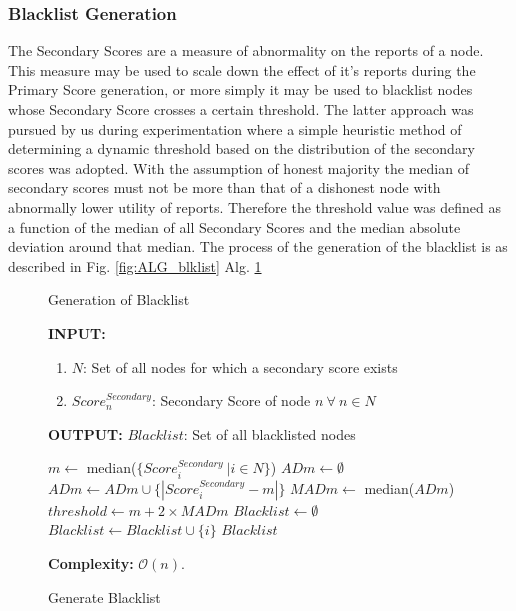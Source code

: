 \documentclass[journal]{IEEEtran}
\makeatletter
\newcommand{\removelatexerror}{\let\@latex@error\@gobble}
\makeatother
\begin{document}
\subsubsection{Blacklist Generation}
The Secondary Scores are a measure of abnormality on the reports of a node. This measure may be used to scale down the effect of it's reports during the Primary Score generation, or more simply it may be used to blacklist nodes whose Secondary Score crosses a certain threshold. The latter approach was pursued by us during experimentation where a simple heuristic method of determining a dynamic threshold based on the distribution of the secondary scores was adopted. With the assumption of honest majority the median of secondary scores must not be more than that of a dishonest node with abnormally lower utility of reports. Therefore the threshold value was defined as a function of the median of all Secondary Scores and the median absolute deviation around that median. The process of the generation of the blacklist is as described in Fig. \ref{fig:ALG_blklist} Alg. \ref {algo:BLKLGen} 
\begin{figure}[!t]\removelatexerror
	\caption{Generation of Blacklist} 
	\label{fig:ALG_blklist}
\begin{algorithm}[H]
	\caption{Generate Blacklist}
	\label{algo:BLKLGen}
	\textbf{INPUT:}
		\begin{enumerate}
			\item $ N $: Set of all nodes for which a secondary score exists
			\item $Score^{Secondary}_n$: Secondary Score of node $n\ \forall\ n \in N$
		\end{enumerate}
	\textbf{OUTPUT:} $Blacklist$: Set of all blacklisted nodes
	\begin{algorithmic}[1]
		\STATE $ m \leftarrow  $ median($\{ Score^{Secondary}_i\ | i \in N\}$)
		\STATE $ ADm \leftarrow \emptyset $
		\STATE $ ADm \leftarrow ADm \cup \{ | Score^{Secondary}_i - m | \} $
		\ENDFOR
		\STATE $ MADm \leftarrow $ median($ADm$)
		\STATE $ threshold \leftarrow m+ 2\times MADm $ 
		\STATE $ Blacklist \leftarrow \emptyset $
				\STATE $ Blacklist \leftarrow Blacklist \cup \{ i \} $
			\ENDIF
		\ENDFOR
		\RETURN $ Blacklist $ 
	\end{algorithmic}
	\textbf{Complexity:} $\mathcal{O}(n)$.
\end{algorithm}
\end{figure}
\end{document}
